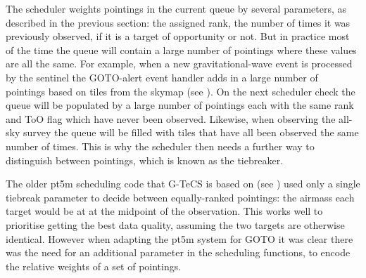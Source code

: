 \begin{colsection}

The scheduler weights pointings in the current queue by several parameters, as described in the previous section: the assigned rank, the number of times it was previously observed, if it is a target of opportunity or not. But in practice most of the time the queue will contain a large number of pointings where these values are all the same. For example, when a new gravitational-wave event is processed by the sentinel the GOTO-alert event handler adds in a large number of pointings based on tiles from the skymap (see ). On the next scheduler check the queue will be populated by a large number of pointings each with the same rank and ToO flag which have never been observed. Likewise, when observing the all-sky survey the queue will be filled with tiles that have all been observed the same number of times. This is why the scheduler then needs a further way to distinguish between pointings, which is known as the tiebreaker.

The older pt5m scheduling code that G-TeCS is based on (see ) used only a single tiebreak parameter to decide between equally-ranked pointings: the airmass each target would be at at the midpoint of the observation. This works well to prioritise getting the best data quality, assuming the two targets are otherwise identical. However when adapting the pt5m system for GOTO it was clear there was the need for an additional parameter in the scheduling functions, to encode the relative weights of a set of pointings.

\end{colsection}



